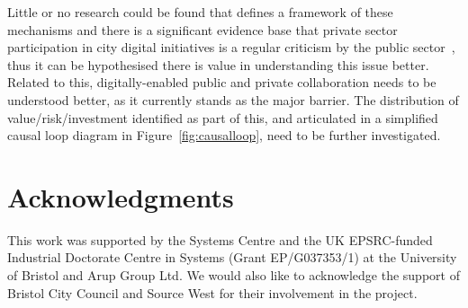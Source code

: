 \documentclass[b5paper,10pt]{article}
\begin{document}
Little or no research could be found that defines a framework of these
mechanisms and there is a significant evidence base that private
sector participation in city digital initiatives is a regular
criticism by the public sector~\citep{martin:2016}, thus it can be
hypothesised there is value in understanding this issue
better. Related to this, digitally-enabled public and private
collaboration needs to be understood better, as it currently stands as
the major barrier. The distribution of value/risk/investment
identified as part of this, and articulated in a simplified causal
loop diagram in Figure~\ref{fig:causalloop}, need to be further
investigated.

\section*{Acknowledgments}

This work was supported by the Systems Centre and the UK EPSRC-funded
Industrial Doctorate Centre in Systems (Grant EP/G037353/1) at the
University of Bristol and Arup Group Ltd. We would also like to
acknowledge the support of Bristol City Council and Source West for
their involvement in the project.




\end{document}
